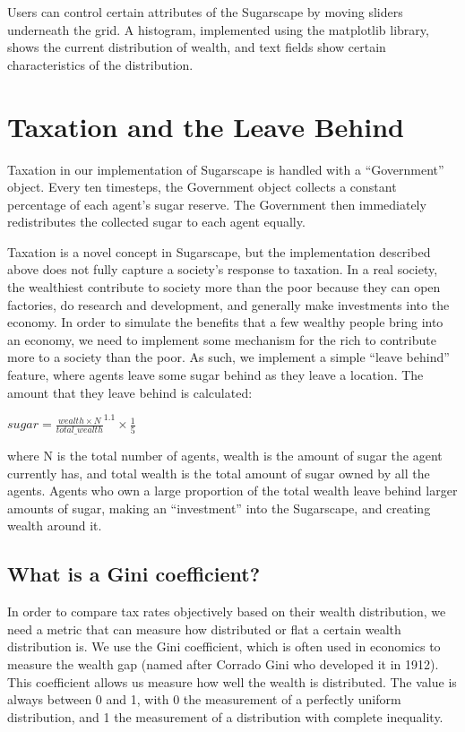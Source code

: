 Users can control certain attributes of the Sugarscape by moving sliders underneath the grid. A histogram, implemented using the matplotlib library, shows the current distribution of wealth, and text fields show certain characteristics of the distribution. 

\section{Taxation and the Leave Behind}

Taxation in our implementation of Sugarscape is handled with a “Government” object. Every ten timesteps, the Government object collects a constant percentage of each agent's sugar reserve. The Government then immediately redistributes the collected sugar to each agent equally.

Taxation is a novel concept in Sugarscape, but the implementation described above does not fully capture a society's response to taxation. In a real society, the wealthiest contribute to society more than the poor because they can open factories, do research and development, and generally make investments into the economy. In order to simulate the benefits that a few wealthy people bring into an economy, we need to implement some mechanism for the rich to contribute more to a society than the poor. As such, we implement a simple “leave behind” feature, where agents leave some sugar behind as they leave a location. The amount that they leave behind is calculated:

$sugar = \frac{wealth\times N}{total\_wealth}^{1.1} \times \frac{1}{5}$

where N is the total number of agents, wealth is the amount of sugar the agent currently has, and total wealth is the total amount of sugar owned by all the agents. Agents who own a large proportion of the total wealth leave behind larger amounts of sugar, making an “investment” into the Sugarscape, and creating wealth around it. 

\subsection{What is a Gini coefficient?}

In order to compare tax rates objectively based on their wealth distribution, we need a metric that can measure how distributed or flat a certain wealth distribution is. We use the Gini coefficient, which is often used in economics to measure the wealth gap (named after Corrado Gini who developed it in 1912). This coefficient allows us measure how well the wealth is distributed. The value is always between 0 and 1, with 0 the measurement of a perfectly uniform distribution, and 1 the measurement of a distribution with complete inequality.

